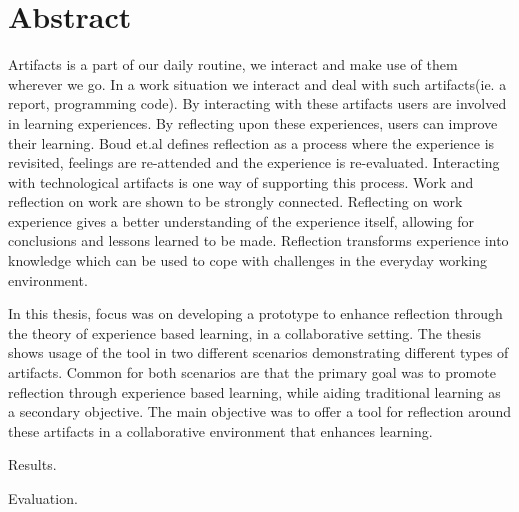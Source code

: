 \chapter*{Abstract}
Artifacts is a part of our daily routine, we interact and make use of them wherever we go. In a work situation we interact and deal with such artifacts(ie. a report, programming code). By interacting with these artifacts users are involved in learning experiences. By reflecting upon these experiences, users can improve their learning. Boud et.al defines reflection as a process where the experience is revisited, feelings are re-attended and the experience is re-evaluated\cite{boudreflection1985}. Interacting with technological artifacts is one way of supporting this process. 
Work and reflection on work are shown to be strongly connected\cite{Schon1983}\cite{Chaiklin1993}. Reflecting on work experience gives a better understanding of the experience itself, allowing for conclusions and lessons learned to be made. 
Reflection transforms experience into knowledge which can be used to cope with challenges in the everyday working environment. 

In this thesis, focus was on developing a prototype to enhance reflection through the theory of experience based learning, in a collaborative setting. The thesis shows usage of the tool in two different scenarios demonstrating different types of artifacts. Common for both scenarios are that the primary goal was to promote reflection through experience based learning, while aiding traditional learning as a secondary objective. 
The main objective was to offer a tool for reflection around these artifacts in a collaborative environment that enhances learning. 

Results.

Evaluation.